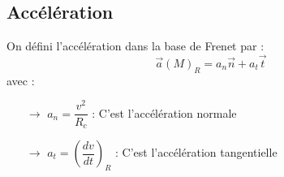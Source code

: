 \subsection{Accélération}
On défini l'accélération dans la base de Frenet par :
$$\overrightarrow{a}(M)_R = a_n\overrightarrow{n} + a_t\overrightarrow{t}$$
avec :
\begin{itemize}
 \item[$\rightarrow$] $a_n = \dfrac{v^2}{R_c}$ : C'est l'accélération normale
 \item[$\rightarrow$] $a_t = \left(\dfrac{dv}{dt}\right)_R$ : C'est l'accélération tangentielle
\end{itemize}

